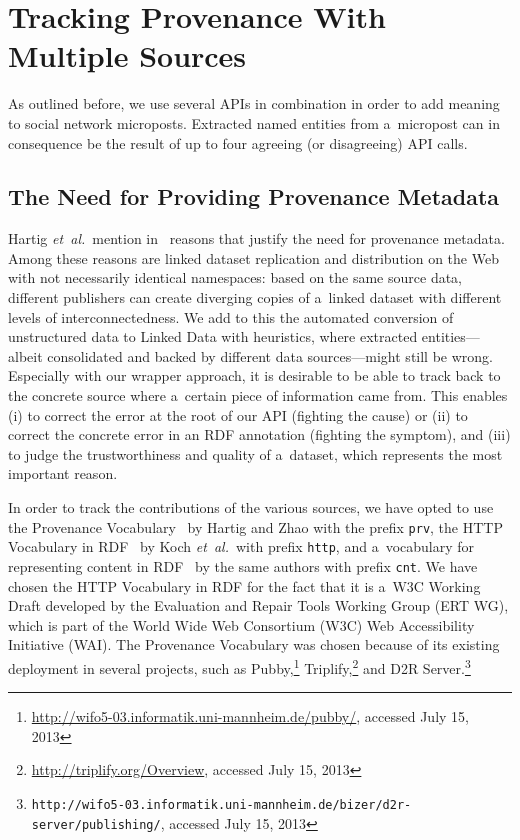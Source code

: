 \section{Tracking Provenance With Multiple Sources}                    \label{sec:tracking}

As outlined before, we use several APIs in combination
in order to add meaning to social network microposts.
Extracted named entities from a~micropost can in consequence
be the result of up to four agreeing (or disagreeing) API calls.

\subsection{The Need for Providing Provenance Metadata}

Hartig \emph{et~al.}\ mention in~\cite{hartig2010provenance}
reasons that justify the need for provenance metadata.
Among these reasons are linked dataset replication and distribution
on the Web with not necessarily identical namespaces:
based on the same source data, different publishers can
create diverging copies of a~linked dataset
with different levels of interconnectedness.
We add to this the automated conversion of unstructured data
to Linked Data with heuristics,
where extracted entities---albeit consolidated
and backed by different data sources---might still be wrong.
Especially with our wrapper approach,
it is desirable to be able to track back to the concrete source
where a~certain piece of information came from.
This enables
(i) to correct the error at the root of our API
(fighting the cause) or
(ii) to correct the concrete error in an RDF annotation
(fighting the symptom), and
(iii) to judge the trustworthiness and quality of a~dataset,
which represents the most important reason.

In order to track the contributions of the various sources,
we have opted to use the Provenance
Vocabulary~\cite{hartig2012provenance}
by Hartig and Zhao with the prefix \texttt{prv},
the HTTP Vocabulary in RDF~\cite{koch2011http}
by Koch \emph{et~al.}\ with prefix \texttt{http},
and a~vocabulary for representing content in
RDF~\cite{koch2011content}
by the same authors with prefix \texttt{cnt}.
We have chosen the HTTP Vocabulary in RDF for the fact that
it is a~W3C Working Draft developed by the
Evaluation and Repair Tools Working Group (ERT WG),
which is part of the World Wide Web Consortium (W3C)
Web Accessibility Initiative (WAI).
The Provenance Vocabulary was chosen because of its existing
deployment in several projects, such as
Pubby,\footnote{\url{http://wifo5-03.informatik.uni-mannheim.de/pubby/},
accessed July 15, 2013}
Triplify,\footnote{\url{http://triplify.org/Overview},
accessed July 15, 2013}
and D2R
Server.\footnote{\texttt{http://wifo5-03.informatik.uni-mannheim.de/bizer/d2r-server/publishing/},
accessed July 15, 2013}

